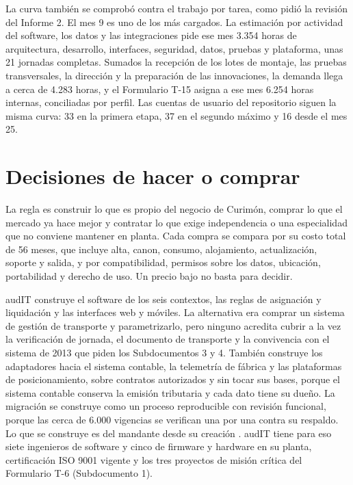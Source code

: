 La curva también se comprobó contra el trabajo por tarea, como pidió la revisión del Informe 2. El mes 9
es uno de los más cargados. La estimación por actividad del software, los datos y las integraciones pide
ese mes 3.354 horas de arquitectura, desarrollo, interfaces, seguridad, datos, pruebas y plataforma, unas
21 jornadas completas. Sumados la recepción de los lotes de montaje, las pruebas transversales, la
dirección y la preparación de las innovaciones, la demanda llega a cerca de 4.283 horas, y el Formulario
T-15 asigna a ese mes 6.254 horas internas, conciliadas por perfil. Las cuentas de usuario del
repositorio siguen la misma curva: 33 en la primera etapa, 37 en el segundo máximo y 16 desde el mes 25.

\section{Decisiones de hacer o comprar}\label{sec:12-decisiones-de-hacer-o-comprar}

La regla es construir lo que es propio del negocio de Curimón, comprar lo que el mercado ya hace mejor y
contratar lo que exige independencia o una especialidad que no conviene mantener en planta. Cada compra
se compara por su costo total de 56 meses, que incluye alta, canon, consumo, alojamiento, actualización,
soporte y salida, y por compatibilidad, permisos sobre los datos, ubicación, portabilidad y derecho de
uso. Un precio bajo no basta para decidir.

audIT construye el software de los seis contextos, las reglas de asignación y liquidación y las
interfaces web y móviles. La alternativa era comprar un sistema de gestión de transporte y
parametrizarlo, pero ninguno acredita cubrir a la vez la verificación de jornada, el documento de
transporte y la convivencia con el sistema de 2013 que piden los Subdocumentos 3 y 4. También construye
los adaptadores hacia el sistema contable, la telemetría de fábrica y las plataformas de posicionamiento,
sobre contratos autorizados y sin tocar sus bases, porque el sistema contable conserva la emisión
tributaria y cada dato tiene su dueño. La migración se construye como un proceso reproducible con
revisión funcional, porque las cerca de 6.000 vigencias se verifican una por una contra su respaldo. Lo
que se construye es del mandante desde su creación . audIT tiene para eso siete
ingenieros de software y cinco de firmware y hardware en su planta, certificación ISO 9001 vigente y los
tres proyectos de misión crítica del Formulario T-6 (Subdocumento 1).

